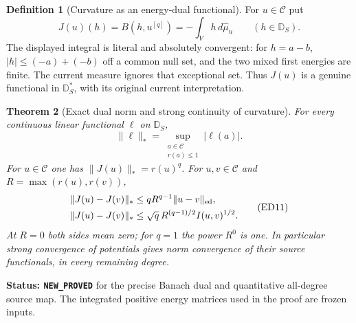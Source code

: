 \documentclass[11pt,a4paper]{article}
\numberwithin{equation}{section}
\newtheorem{theorem}{Theorem}[section]
\theoremstyle{definition}
\newtheorem{definition}[theorem]{Definition}
\theoremstyle{remark}
\begin{document}
\begin{definition}[Curvature as an energy-dual functional]
\label{def:r12-dual-curvature}
For $u\in\mathscr C$ put
\[
       J(u)(h)=B(h,u^{[q]})=-\int_Vh\,d\widehat\mu_u
                      \qquad(h\in\mathbb D_S).
 \tag{ED9}
\]
The displayed integral is literal and absolutely convergent: for
$h=a-b$, $|h|\leq(-a)+(-b)$ off a common null set, and the
two mixed first energies are finite. The current measure ignores
that exceptional set. Thus $J(u)$ is a genuine functional in
$\mathbb D_S^*$, with its original current interpretation.
\end{definition}

\begin{theorem}[Exact dual norm and strong continuity of curvature]
\label{thm:r12-dual-curvature-continuity}
For every continuous linear functional $\ell$ on $\mathbb D_S$,
\[
 \|\ell\|_*=
     \sup_{\substack{a\in\mathscr C\\r(a)\leq1}}|\ell(a)|.
 \tag{ED10}
\]
For $u\in\mathscr C$ one has $\|J(u)\|_*=r(u)^q$.
For $u,v\in\mathscr C$ and $R=\max(r(u),r(v))$,
\[
 \begin{split}
 \|J(u)-J(v)\|_*&\leq qR^{q-1}\|u-v\|_{\rm ed},\\
 \|J(u)-J(v)\|_*&\leq\sqrt q\,R^{(q-1)/2}I(u,v)^{1/2}.
 \end{split}
 \tag{ED11}
\]
At $R=0$ both sides mean zero; for $q=1$ the power $R^0$ is
one. In particular strong convergence of potentials gives norm
convergence of their source functionals, in every remaining degree.
\end{theorem}

\noindent\textbf{Status: \texttt{NEW\_PROVED}} for the precise
Banach dual and quantitative all-degree source map. The integrated
positive energy matrices used in the proof are frozen inputs.
\end{document}
